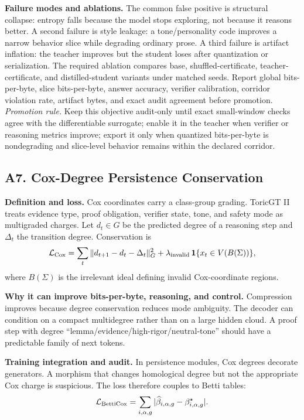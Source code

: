 \documentclass[10pt]{article}
\newcommand{\loss}{\mathcal{L}}
\numberwithin{equation}{section}
\begin{document}
\noindent\textbf{Failure modes and ablations.} The common false positive is structural collapse: entropy falls because the model stops exploring, not because it reasons better. A second failure is style leakage: a tone/personality code improves a narrow behavior slice while degrading ordinary prose. A third failure is artifact inflation: the teacher improves but the student loses after quantization or serialization. The required ablation compares base, shuffled-certificate, teacher-certificate, and distilled-student variants under matched seeds. Report global bits-per-byte, slice bits-per-byte, answer accuracy, verifier calibration, corridor violation rate, artifact bytes, and exact audit agreement before promotion.
\vfill
\noindent\emph{Promotion rule.} Keep this objective audit-only until exact small-window checks agree with the differentiable surrogate; enable it in the teacher when verifier or reasoning metrics improve; export it only when quantized bits-per-byte is nondegrading and slice-level behavior remains within the declared corridor.
\clearpage
\subsection{A7. Cox-Degree Persistence Conservation}
\noindent\textbf{Definition and loss.} Cox coordinates carry a class-group grading. ToricGT II treats evidence type, proof obligation, verifier state, tone, and safety mode as multigraded charges. Let $d_t\in G$ be the predicted degree of a reasoning step and $\Delta_t$ the transition degree. Conservation is
\[
\loss_{\rm Cox}=\sum_t\|d_{t+1}-d_t-\Delta_t\|_G^2+\lambda_{\rm invalid}\,\mathbf 1\{x_t\in V(B(\Sigma))\},
\]
where $B(\Sigma)$ is the irrelevant ideal defining invalid Cox-coordinate regions.

\noindent\textbf{Why it can improve bits-per-byte, reasoning, and control.} Compression improves because degree conservation reduces mode ambiguity. The decoder can condition on a compact multidegree rather than on a large hidden cloud. A proof step with degree ``lemma/evidence/high-rigor/neutral-tone'' should have a predictable family of next tokens.

\noindent\textbf{Training integration and audit.} In persistence modules, Cox degrees decorate generators. A morphism that changes homological degree but not the appropriate Cox charge is suspicious. The loss therefore couples to Betti tables:
\[
\loss_{\rm BettiCox}=\sum_{i,\alpha,g}|\widehat\beta_{i,\alpha,g}-\beta_{i,\alpha,g}^\star|.
\]
\end{document}

